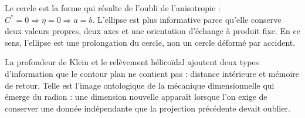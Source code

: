 Le cercle est la forme qui résulte de l'oubli de l'anisotropie :
\(C^*=0\Rightarrow\eta=0\Rightarrow a=b\). L'ellipse est plus informative parce qu'elle
conserve deux valeurs propres, deux axes et une orientation d'échange à produit
fixe. En ce sens, l'ellipse est une prolongation du cercle, non un cercle
déformé par accident.

La profondeur de Klein et le relèvement hélicoïdal ajoutent deux types d'information
que le contour plan ne contient pas : distance intérieure et mémoire de retour.
Telle est l'image ontologique de la mécanique dimensionnelle qui émerge du radion :
une dimension nouvelle apparaît lorsque l'on exige de conserver une donnée indépendante
que la projection précédente devait oublier.


